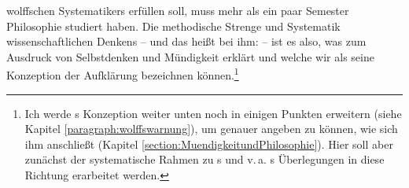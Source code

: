 wolffschen Systematikers erfüllen soll, muss mehr als ein paar
Semester Philosophie studiert haben. Die methodische Strenge und Systematik
wissenschaftlichen Denkens -- und das heißt bei ihm:  -- ist es
also, was  zum Ausdruck von Selbstdenken und Mündigkeit erklärt und
welche wir als seine Konzeption der Aufklärung bezeichnen können.\footnote{Ich
werde s Konzeption weiter unten noch in einigen Punkten erweitern
(siehe Kapitel \ref{paragraph:wolffswarnung}), um genauer angeben zu können,
wie  sich ihm anschließt (Kapitel
\ref{section:MuendigkeitundPhilosophie}). Hier soll aber zunächst der
systematische Rahmen zu s und v.\,a.
s Überlegungen in diese Richtung erarbeitet werden.}


